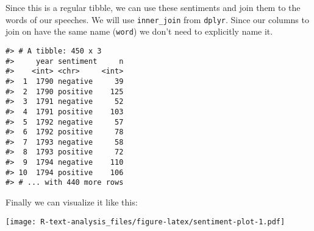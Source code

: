 \documentclass[]{book}
\newenvironment{Shaded}{\begin{snugshade}}{\end{snugshade}}
\newcommand{\CommentTok}[1]{\textcolor[rgb]{0.56,0.35,0.01}{\textit{#1}}}
\newcommand{\DataTypeTok}[1]{\textcolor[rgb]{0.13,0.29,0.53}{#1}}
\newcommand{\DecValTok}[1]{\textcolor[rgb]{0.00,0.00,0.81}{#1}}
\newcommand{\KeywordTok}[1]{\textcolor[rgb]{0.13,0.29,0.53}{\textbf{#1}}}
\newcommand{\NormalTok}[1]{#1}
\newcommand{\OperatorTok}[1]{\textcolor[rgb]{0.81,0.36,0.00}{\textbf{#1}}}
\newcommand{\StringTok}[1]{\textcolor[rgb]{0.31,0.60,0.02}{#1}}
\begin{document}
Since this is a regular tibble, we can use these sentiments and join them to the words of our speeches. We will use \texttt{inner\_join} from \texttt{dplyr}. Since our columns to join on have the same name (\texttt{word}) we don't need to explicitly name it.

\begin{Shaded}
\end{Shaded}

\begin{verbatim}
#> # A tibble: 450 x 3
#>     year sentiment     n
#>    <int> <chr>     <int>
#>  1  1790 negative     39
#>  2  1790 positive    125
#>  3  1791 negative     52
#>  4  1791 positive    103
#>  5  1792 negative     57
#>  6  1792 positive     78
#>  7  1793 negative     58
#>  8  1793 positive     72
#>  9  1794 negative    110
#> 10  1794 positive    106
#> # ... with 440 more rows
\end{verbatim}

Finally we can visualize it like this:

\begin{Shaded}
\end{Shaded}

\texttt{[image: R-text-analysis\_files/figure-latex/sentiment-plot-1.pdf]}


\end{document}
